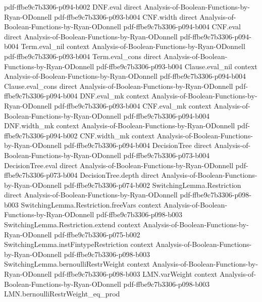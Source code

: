 \begin{theorem}
  {pdf-ffbe9c7b3306-p094-b002}
\proofstep
  {DNF.eval}
  {direct}
  {Analysis-of-Boolean-Functions-by-Ryan-ODonnell}
  {pdf-ffbe9c7b3306-p093-b004}
\proofstep
  {CNF.width}
  {direct}
  {Analysis-of-Boolean-Functions-by-Ryan-ODonnell}
  {pdf-ffbe9c7b3306-p094-b004}
\proofstep
  {CNF.eval}
  {direct}
  {Analysis-of-Boolean-Functions-by-Ryan-ODonnell}
  {pdf-ffbe9c7b3306-p094-b004}
\proofstep
  {Term.eval_nil}
  {context}
  {Analysis-of-Boolean-Functions-by-Ryan-ODonnell}
  {pdf-ffbe9c7b3306-p093-b004}
\proofstep
  {Term.eval_cons}
  {direct}
  {Analysis-of-Boolean-Functions-by-Ryan-ODonnell}
  {pdf-ffbe9c7b3306-p093-b004}
\proofstep
  {Clause.eval_nil}
  {context}
  {Analysis-of-Boolean-Functions-by-Ryan-ODonnell}
  {pdf-ffbe9c7b3306-p094-b004}
\proofstep
  {Clause.eval_cons}
  {direct}
  {Analysis-of-Boolean-Functions-by-Ryan-ODonnell}
  {pdf-ffbe9c7b3306-p094-b004}
\proofstep
  {DNF.eval_mk}
  {context}
  {Analysis-of-Boolean-Functions-by-Ryan-ODonnell}
  {pdf-ffbe9c7b3306-p093-b004}
\proofstep
  {CNF.eval_mk}
  {context}
  {Analysis-of-Boolean-Functions-by-Ryan-ODonnell}
  {pdf-ffbe9c7b3306-p094-b004}
\proofstep
  {DNF.width_mk}
  {context}
  {Analysis-of-Boolean-Functions-by-Ryan-ODonnell}
  {pdf-ffbe9c7b3306-p094-b002}
\proofstep
  {CNF.width_mk}
  {context}
  {Analysis-of-Boolean-Functions-by-Ryan-ODonnell}
  {pdf-ffbe9c7b3306-p094-b004}
\proofstep
  {DecisionTree}
  {direct}
  {Analysis-of-Boolean-Functions-by-Ryan-ODonnell}
  {pdf-ffbe9c7b3306-p073-b004}
\proofstep
  {DecisionTree.eval}
  {direct}
  {Analysis-of-Boolean-Functions-by-Ryan-ODonnell}
  {pdf-ffbe9c7b3306-p073-b004}
\proofstep
  {DecisionTree.depth}
  {direct}
  {Analysis-of-Boolean-Functions-by-Ryan-ODonnell}
  {pdf-ffbe9c7b3306-p074-b002}
\proofstep
  {SwitchingLemma.Restriction}
  {direct}
  {Analysis-of-Boolean-Functions-by-Ryan-ODonnell}
  {pdf-ffbe9c7b3306-p098-b003}
\proofstep
  {SwitchingLemma.Restriction.freeVars}
  {context}
  {Analysis-of-Boolean-Functions-by-Ryan-ODonnell}
  {pdf-ffbe9c7b3306-p098-b003}
\proofstep
  {SwitchingLemma.Restriction.extend}
  {context}
  {Analysis-of-Boolean-Functions-by-Ryan-ODonnell}
  {pdf-ffbe9c7b3306-p075-b002}
\proofstep
  {SwitchingLemma.instFintypeRestriction}
  {context}
  {Analysis-of-Boolean-Functions-by-Ryan-ODonnell}
  {pdf-ffbe9c7b3306-p098-b003}
\proofstep
  {SwitchingLemma.bernoulliRestrWeight}
  {context}
  {Analysis-of-Boolean-Functions-by-Ryan-ODonnell}
  {pdf-ffbe9c7b3306-p098-b003}
\proofstep
  {LMN.varWeight}
  {context}
  {Analysis-of-Boolean-Functions-by-Ryan-ODonnell}
  {pdf-ffbe9c7b3306-p098-b003}
\proofstep
  {LMN.bernoulliRestrWeight_eq_prod}

\end{theorem}
